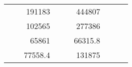 \begin{table}[H]
\begin{tabular}{|ccrccrccc}
\multicolumn{1}{|c|}{\cellcolor[HTML]{FFFFC7}}                                & \multicolumn{1}{c|}{\cellcolor[HTML]{DDFDFF}}                      & \multicolumn{1}{r|}{\cellcolor[HTML]{DAE8FC}191183}    & \multicolumn{1}{c|}{\cellcolor[HTML]{FFFFC7}}                                & \multicolumn{1}{c|}{\cellcolor[HTML]{DDFDFF}}                       & \multicolumn{1}{r|}{\cellcolor[HTML]{DDFDFF}444807}    &                                                                              &                                                                    &                                                        \\ \cline{3-3} \cline{6-6}
\multicolumn{1}{|c|}{\cellcolor[HTML]{FFFFC7}}                                & \multicolumn{1}{c|}{\cellcolor[HTML]{DDFDFF}}                      & \multicolumn{1}{r|}{\cellcolor[HTML]{DDFDFF}102565}    & \multicolumn{1}{c|}{\cellcolor[HTML]{FFFFC7}}                                & \multicolumn{1}{c|}{\cellcolor[HTML]{DDFDFF}}                       & \multicolumn{1}{r|}{\cellcolor[HTML]{DAE8FC}277386}    &                                                                              &                                                                    &                                                        \\ \cline{3-3} \cline{6-6}
\multicolumn{1}{|c|}{\cellcolor[HTML]{FFFFC7}}                                & \multicolumn{1}{c|}{\cellcolor[HTML]{DDFDFF}}                      & \multicolumn{1}{r|}{\cellcolor[HTML]{DAE8FC}65861}     & \multicolumn{1}{c|}{\cellcolor[HTML]{FFFFC7}}                                & \multicolumn{1}{c|}{\cellcolor[HTML]{DDFDFF}}                       & \multicolumn{1}{r|}{\cellcolor[HTML]{DDFDFF}66315.8}   &                                                                              &                                                                    &                                                        \\ \cline{3-3} \cline{6-6}
\multicolumn{1}{|c|}{\cellcolor[HTML]{FFFFC7}}                                & \multicolumn{1}{c|}{\cellcolor[HTML]{DDFDFF}}                      & \multicolumn{1}{r|}{\cellcolor[HTML]{DDFDFF}77558.4}   & \multicolumn{1}{c|}{\cellcolor[HTML]{FFFFC7}}                                & \multicolumn{1}{c|}{\cellcolor[HTML]{DDFDFF}}                       & \multicolumn{1}{r|}{\cellcolor[HTML]{DAE8FC}131875}    &                                                                              &                                                                    &                                                        \\ \cline{3-3} \cline{6-6}

\end{tabular}
\end{table}
